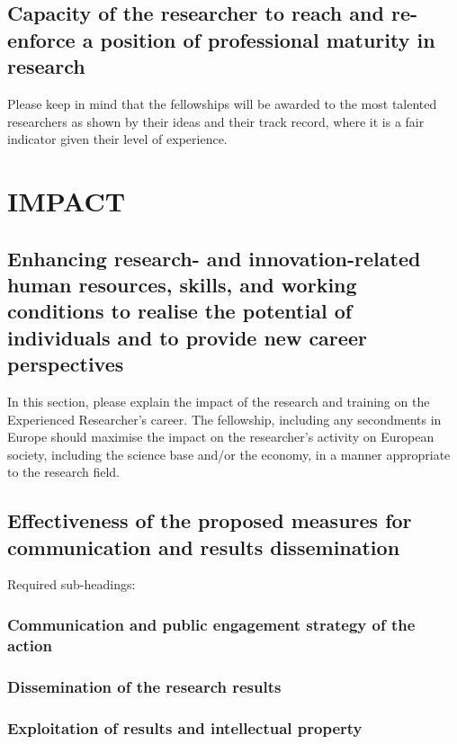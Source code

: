 \documentclass[a4paper,11pt]{article}
\begin{document}
\subsection{Capacity of the researcher to reach and re-enforce a position of professional maturity in research}
\label{sec:maturity}

Please keep in mind that the fellowships will be awarded to the most talented researchers as shown by their ideas and their track record, where it is a fair indicator given their level of experience. 

\section{IMPACT}
\label{sec:impact}

\subsection{Enhancing research- and innovation-related human resources, skills, and working conditions to realise the potential of individuals and to provide new career perspectives}
\label{sec:enhancement}

In this section, please explain the impact of the research and training on the Experienced Researcher's career. The fellowship, including any secondments in Europe should maximise the impact on the researcher's activity on European society, including the science base and/or the economy, in a manner appropriate to the research field. 

\subsection{Effectiveness of the proposed measures for communication and results dissemination}

Required sub-headings: 

\subsubsection*{Communication and public engagement strategy of the action}
\subsubsection*{Dissemination of the research results}
\subsubsection*{Exploitation of results and intellectual property}
\end{document}
